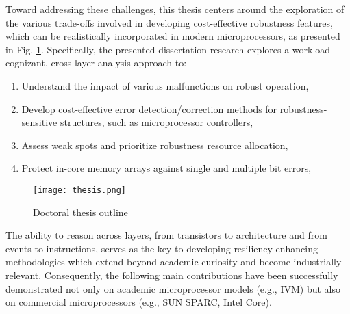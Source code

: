 \documentclass[12pt]{yalephd}
\begin{document}
Toward addressing these challenges, this thesis centers around the exploration of the various trade-offs involved in developing cost-effective robustness features, which can be realistically incorporated in modern microprocessors, as presented in Fig. \ref{fOutline}. Specifically, the presented dissertation research explores a workload-cognizant, cross-layer analysis approach to: 

\begin{enumerate}
	\item Understand the impact of various malfunctions on robust operation,%
	\item Develop cost-effective error detection/correction methods for robustness-sensitive structures, such as microprocessor controllers,%
	\item Assess weak spots and prioritize robustness resource allocation,%
	\item Protect in-core memory arrays against single and multiple bit errors,%
\end{enumerate}

\begin{figure}[!ht]%
\centering
\texttt{[image: thesis.png]}%
\caption{Doctoral thesis outline}%
\label{fOutline}%
\end{figure}

The ability to reason across layers, from transistors to architecture and from events to instructions, serves as the key to developing resiliency enhancing methodologies which extend beyond academic curiosity and become industrially relevant. Consequently, the following main contributions have been successfully demonstrated not only on academic microprocessor models (e.g., IVM) but also on commercial microprocessors (e.g., SUN SPARC, Intel Core). 
\end{document}
